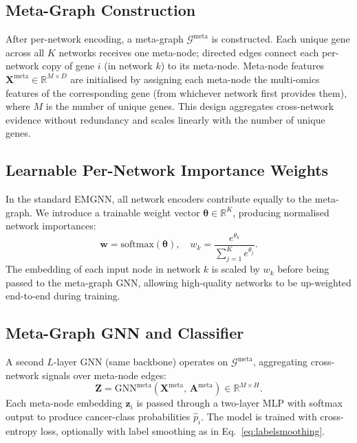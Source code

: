 \subsection{Meta-Graph Construction}

After per-network encoding, a meta-graph $\mathcal{G}^{\text{meta}}$ is constructed.
Each unique gene across all $K$ networks receives one meta-node; directed edges connect
each per-network copy of gene $i$ (in network $k$) to its meta-node. Meta-node features
$\mathbf{X}^{\text{meta}} \in \mathbb{R}^{M \times D}$ are initialised by assigning each
meta-node the multi-omics features of the corresponding gene (from whichever network first
provides them), where $M$ is the number of unique genes. This design aggregates
cross-network evidence without redundancy and scales linearly with the number of unique genes.

\subsection{Learnable Per-Network Importance Weights}

In the standard EMGNN, all network encoders contribute equally to the meta-graph.
We introduce a trainable weight vector $\boldsymbol{\theta} \in \mathbb{R}^{K}$, producing
normalised network importances:
\begin{equation}
  \mathbf{w} = \text{softmax}(\boldsymbol{\theta}), \quad
  w_k = \frac{e^{\theta_k}}{\sum_{j=1}^{K} e^{\theta_j}}.
  \label{eq:network_weights}
\end{equation}
The embedding of each input node in network $k$ is scaled by $w_k$ before being
passed to the meta-graph GNN, allowing high-quality networks to be up-weighted
end-to-end during training.

\subsection{Meta-Graph GNN and Classifier}

A second $L$-layer GNN (same backbone) operates on $\mathcal{G}^{\text{meta}}$,
aggregating cross-network signals over meta-node edges:
\begin{equation}
  \mathbf{Z} = \text{GNN}^{\text{meta}}\!\left(\mathbf{X}^{\text{meta}},\,
  \mathbf{A}^{\text{meta}}\right) \in \mathbb{R}^{M \times H}.
  \label{eq:meta_gnn}
\end{equation}
Each meta-node embedding $\mathbf{z}_i$ is passed through a two-layer MLP with softmax
output to produce cancer-class probabilities $\hat{p}_i$. The model is trained with
cross-entropy loss, optionally with label smoothing as in Eq.~\ref{eq:labelsmoothing}.

